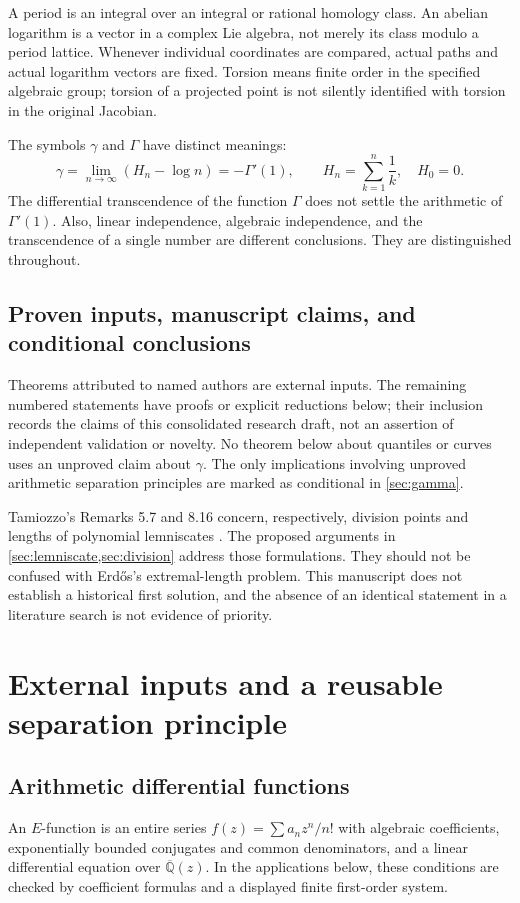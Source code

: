 \documentclass[11pt,a4paper]{article}
\numberwithin{equation}{section}
\theoremstyle{definition}
\theoremstyle{remark}
\newcommand{\Qb}{\overline{\mathbb Q}}
\begin{document}
A period is an integral over an integral or rational homology class. An abelian
logarithm is a vector in a complex Lie algebra, not merely its class modulo a
period lattice. Whenever individual coordinates are compared, actual paths
and actual logarithm vectors are fixed. Torsion means finite order in the
specified algebraic group; torsion of a projected point is not silently
identified with torsion in the original Jacobian.

The symbols $\gamma$ and $\Gamma$ have distinct meanings:
\begin{equation}\label{eq:gamma-def}
 \gamma=\lim_{n\to\infty}(H_n-\log n)=-\Gamma'(1),\qquad
 H_n=\sum_{k=1}^n\frac1k,\quad H_0=0.
\end{equation}
The differential transcendence of the function $\Gamma$ does not settle the
arithmetic of $\Gamma'(1)$. Also, linear independence, algebraic independence,
and the transcendence of a single number are different conclusions. They
are distinguished throughout.

\subsection{Proven inputs, manuscript claims, and conditional conclusions}
Theorems attributed to named authors are external inputs. The remaining
numbered statements have proofs or explicit reductions below; their inclusion
records the claims of this consolidated research draft, not an assertion of
independent validation or novelty. No theorem below about quantiles or curves
uses an unproved claim about $\gamma$. The only implications involving
unproved arithmetic separation principles are marked as conditional in
\cref{sec:gamma}.

Tamiozzo's Remarks 5.7 and 8.16 concern, respectively, division points and
lengths of polynomial lemniscates \cite{Tamiozzo}. The proposed arguments in
\cref{sec:lemniscate,sec:division} address those formulations. They should not
be confused with Erd\H{o}s's extremal-length problem. This manuscript does not
establish a historical first solution, and the absence of an identical
statement in a literature search is not evidence of priority.

\section{External inputs and a reusable separation principle}\label{sec:inputs}
\subsection{Arithmetic differential functions}
An $E$-function is an entire series $f(z)=\sum a_nz^n/n!$ with algebraic
coefficients, exponentially bounded conjugates and common denominators, and
a linear differential equation over $\Qb(z)$. In the applications below,
these conditions are checked by coefficient formulas and a displayed finite
first-order system.
\end{document}
